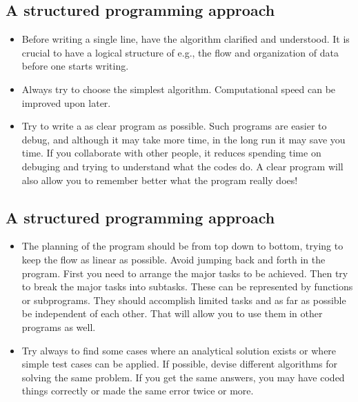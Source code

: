 \documentclass[%
oneside,                 %
final,                   %
10pt]{article}
\begin{document}
\noindent



\subsection{A structured programming approach}

\begin{itemize}
  \item Before writing a single line, have the algorithm clarified and understood. It is crucial to have a logical structure of e.g., the flow and organization of data before one starts writing.

  \item Always try to choose the simplest algorithm. Computational speed can be improved upon later.

  \item Try to write a as clear program as possible. Such programs are easier to debug, and although it may take more time, in the long run it may save you time. If you collaborate with other people, it reduces spending time on debuging and trying to understand what the codes do. A clear program will also allow you to remember better what the program really does!
\end{itemize}

\noindent
\subsection{A structured programming approach}

\begin{itemize}
  \item The planning of the program should be from top down to bottom, trying to keep the flow as linear as possible. Avoid jumping back and forth in the program. First you need to arrange the major tasks to be achieved. Then try to break the major tasks into subtasks. These can be represented by functions or subprograms. They should accomplish limited tasks and as far as possible be independent of each other. That will allow you to use them in other programs as well.

  \item Try always to find some cases where an analytical solution exists or where simple test cases can be applied. If possible, devise different algorithms for solving the same problem. If you get the same answers, you may have coded things correctly or made the same error twice or more.
\end{itemize}

\noindent



\printindex
\end{document}
